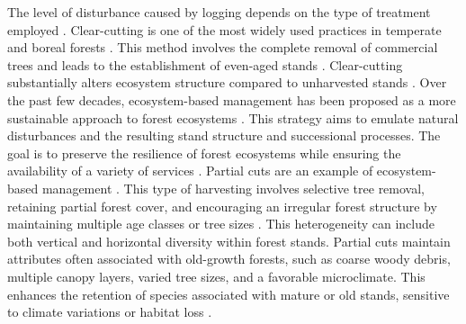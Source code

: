 The level of disturbance caused by logging depends on the type of treatment employed \citep{Harpole1999Effectsseven,Chaudhary2016Impactforest,Koivula2019Responsesboreal}. 
Clear-cutting is one of the most widely used practices in temperate and boreal forests \citep{Fedrowitz2014Canretention,Chaudhary2016Impactforest}. 
This method involves the complete removal of commercial trees and leads to the establishment of even-aged stands \citep{Brashears2004AssessmentCanopy,Martin2020Forestmanagement}. 
Clear-cutting substantially alters ecosystem structure compared to unharvested stands \citep{Hanski2000Extinctiondebt}. 
Over the past few decades, ecosystem-based management has been proposed as a more sustainable approach to forest ecosystems \citep{Perry1998scientificbasis,Kuuluvainen2002Naturalvariabilitya}. 
This strategy aims to emulate natural disturbances and the resulting stand structure and successional processes. 
The goal is to preserve the resilience of forest ecosystems while ensuring the availability of a variety of services \citep{Szaro1998emergenceecosystem,MacDicken2015Globalprogress}. 
Partial cuts are an example of ecosystem-based management \citep{Bergeron1999Forestmanagementa,Raymond2009irregularshelterwood}. 
This type of harvesting involves selective tree removal, retaining partial forest cover, and encouraging an irregular forest structure by maintaining multiple age classes or tree sizes \citep{Raymond2009irregularshelterwood}. 
This heterogeneity can include both vertical and horizontal diversity within forest stands. 
Partial cuts maintain attributes often associated with old-growth forests, such as coarse woody debris, multiple canopy layers, varied tree sizes, and a favorable microclimate. 
This enhances the retention of species associated with mature or old stands, sensitive to climate variations or habitat loss \citep{Hansen1991Conservingbiodiversity,Ameray2021Forestcarbon}. 

